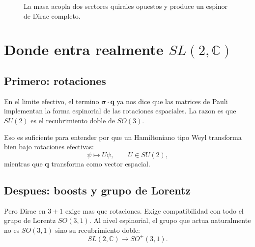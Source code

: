\begin{figure}[h!]
\centering
{}
\caption{La masa acopla dos sectores quirales opuestos y produce un espinor de Dirac completo.}
\end{figure}

\section{\texorpdfstring{Donde entra realmente \(SL(2,\mathbb{C})\)}{Donde entra realmente SL(2,C)}}
\subsection{Primero: rotaciones}
En el limite efectivo, el termino $\bm{\sigma}\cdot\bm{q}$ ya nos dice que las matrices de Pauli implementan la forma espinorial de las rotaciones espaciales. La razon es que $SU(2)$ es el recubrimiento doble de $SO(3)$.

Eso es suficiente para entender por que un Hamiltoniano tipo Weyl transforma bien bajo rotaciones efectivas:
\begin{equation}
\psi \mapsto U\psi,
\qquad
U\in SU(2),
\end{equation}
mientras que $\bm{q}$ transforma como vector espacial.

\subsection{Despues: boosts y grupo de Lorentz}
Pero Dirac en \(3+1\) exige mas que rotaciones. Exige compatibilidad con todo el grupo de Lorentz $SO(3,1)$. Al nivel espinorial, el grupo que actua naturalmente no es $SO(3,1)$ sino su recubrimiento doble:
\begin{equation}
SL(2,\mathbb{C}) \longrightarrow SO^+(3,1).
\end{equation}

